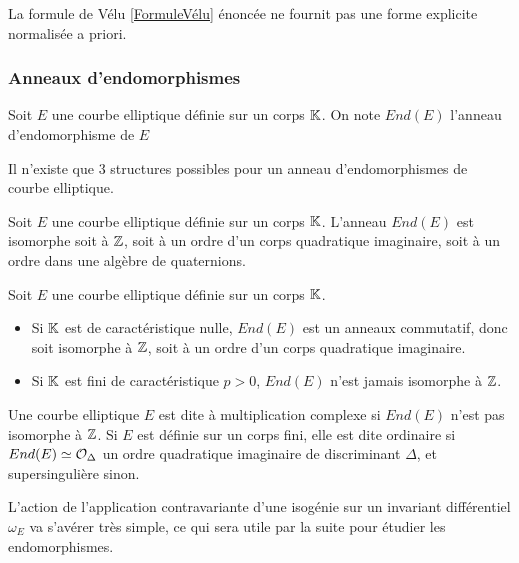 \begin{Rem}
	La formule de Vélu \ref{FormuleVélu} énoncée ne fournit pas une forme explicite normalisée a priori.
\end{Rem}




\subsubsection{Anneaux d'endomorphismes}

\begin{Def}
	Soit $E$ une courbe elliptique définie sur un corps $\mathbb{K}$. On note $End(E)$ l'anneau d'endomorphisme de $E$
\end{Def}

Il n'existe que $3$ structures possibles pour un anneau d'endomorphismes de courbe elliptique.

\begin{The}
	
	Soit $E$ une courbe elliptique définie sur un corps $\mathbb{K}$. L’anneau $End(E)$ est isomorphe soit à $\mathbb{Z}$, soit à un ordre d'un corps quadratique imaginaire, soit à un ordre dans une algèbre de quaternions.
\end{The}

\begin{Rem} Soit $E$ une courbe elliptique définie sur un corps $\mathbb{K}$.
	\begin{itemize}
		\item Si $\mathbb{K}$ est de caractéristique nulle, $End(E)$ est un anneaux commutatif, donc soit isomorphe à $\mathbb{Z}$, soit à un ordre d'un corps quadratique imaginaire.
		\item Si $\mathbb{K}$ est fini de caractéristique $p>0$, $End(E)$ n'est jamais isomorphe à $\mathbb{Z}$.
	\end{itemize}
\end{Rem}

  
\begin{Def}
	Une courbe elliptique $E$ est dite à multiplication complexe si $End(E)$ n'est pas isomorphe à $\mathbb{Z}$. Si $E$ est définie sur un corps fini, elle est dite ordinaire si $End(E)\simeq \mathcal{O}_{\Delta}$ un ordre quadratique imaginaire de discriminant $\Delta$, et supersingulière sinon.  
\end{Def}

L'action de l'application contravariante d'une isogénie sur un invariant différentiel $\omega_{E}$ va s'avérer très simple, ce qui sera utile par la suite pour étudier les endomorphismes. 

